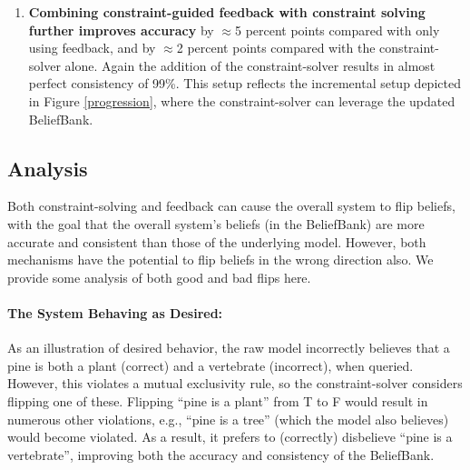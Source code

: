 \documentclass[11pt]{article}
\begin{document}
\begin{enumerate}
\item {\bf Combining constraint-guided feedback with constraint solving further improves accuracy} by $\approx$5 percent points compared with only using feedback,
and by $\approx$2 percent points compared with the constraint-solver alone.
Again the addition of the constraint-solver results in
almost perfect consistency of 99\%. This setup reflects the incremental setup depicted in Figure \ref{progression}, where 
the constraint-solver can leverage the updated BeliefBank.

\end{enumerate}

\subsection{Analysis \label{analysis}}

Both constraint-solving and feedback can cause the overall system to flip beliefs, with
the goal that the overall system's beliefs (in the BeliefBank) are more accurate and consistent
than those of the underlying model. However, both mechanisms have the potential to flip
beliefs in the wrong direction also. We provide some analysis of both good and bad flips
here.

\paragraph{The System Behaving as Desired:} 
As an illustration of desired behavior, the raw model incorrectly believes that a pine is both a plant (correct) and a
vertebrate (incorrect), when queried. However, this violates a mutual exclusivity rule, so the constraint-solver
considers flipping one of these. Flipping ``pine is a plant'' from T to F would result in 
numerous other violations, e.g., ``pine is a tree'' (which the model also believes)
would become violated. As a result, it prefers to (correctly) disbelieve ``pine is a vertebrate'', improving
both the accuracy and consistency of the BeliefBank.
\end{document}
